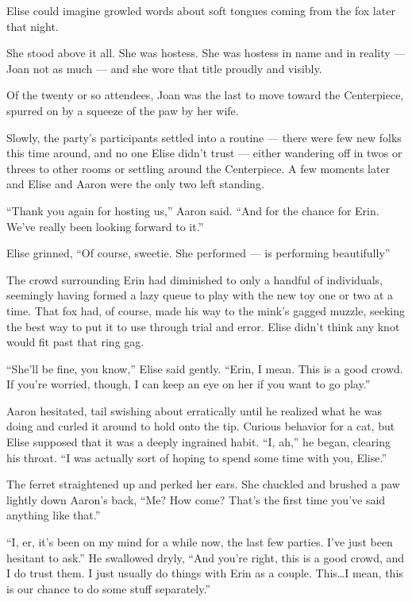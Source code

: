 Elise could imagine growled words about soft tongues coming from the fox later that night.

She stood above it all. She was hostess. She was hostess in name and in reality --- Joan not as much --- and she wore that title proudly and visibly.

Of the twenty or so attendees, Joan was the last to move toward the Centerpiece, spurred on by a squeeze of the paw by her wife.

Slowly, the party's participants settled into a routine --- there were few new folks this time around, and no one Elise didn't trust --- either wandering off in twos or threes to other rooms or settling around the Centerpiece. A few moments later and Elise and Aaron were the only two left standing.

``Thank you again for hosting us,'' Aaron said. ``And for the chance for Erin. We've really been looking forward to it.''

Elise grinned, ``Of course, sweetie. She performed --- is performing beautifully''

The crowd surrounding Erin had diminished to only a handful of individuals, seemingly having formed a lazy queue to play with the new toy one or two at a time. That fox had, of course, made his way to the mink's gagged muzzle, seeking the best way to put it to use through trial and error. Elise didn't think any knot would fit past that ring gag.

``She'll be fine, you know,'' Elise said gently. ``Erin, I mean. This is a good crowd. If you're worried, though, I can keep an eye on her if you want to go play.''

Aaron hesitated, tail swishing about erratically until he realized what he was doing and curled it around to hold onto the tip. Curious behavior for a cat, but Elise supposed that it was a deeply ingrained habit. ``I, ah,'' he began, clearing his throat. ``I was actually sort of hoping to spend some time with you, Elise.''

The ferret straightened up and perked her ears. She chuckled and brushed a paw lightly down Aaron's back, ``Me? How come? That's the first time you've said anything like that.''

``I, er, it's been on my mind for a while now, the last few parties. I've just been hesitant to ask.'' He swallowed dryly, ``And you're right, this is a good crowd, and I do trust them. I just usually do things with Erin as a couple. This\ldots{}I mean, this is our chance to do some stuff separately.''


